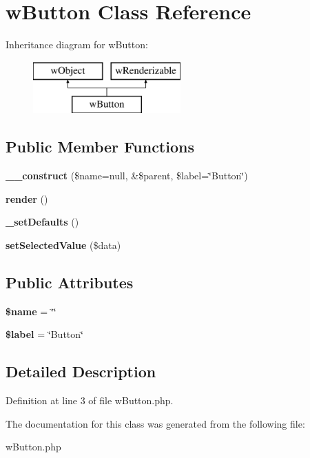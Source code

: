 \hypertarget{classwButton}{
\section{wButton Class Reference}
\label{classwButton}
}
Inheritance diagram for wButton:\begin{figure}[H]
\begin{center}
\leavevmode
\includegraphics[height=2.000000cm]{classwButton}
\end{center}
\end{figure}
\subsection*{Public Member Functions}
\begin{DoxyCompactItemize}
\item 
\hypertarget{classwButton_ae1900cf64a51d0ccc4e9fe46c0e8ad3c}{
{\bfseries \_\-\_\-construct} (\$name=null, \&\$parent, \$label=\char`\"{}Button\char`\"{})}
\label{classwButton_ae1900cf64a51d0ccc4e9fe46c0e8ad3c}

\item 
\hypertarget{classwButton_afa51efa71e726ced911b25826ba7f164}{
{\bfseries render} ()}
\label{classwButton_afa51efa71e726ced911b25826ba7f164}

\item 
\hypertarget{classwButton_a3badb068eb0f51744c3cb18389ad786d}{
{\bfseries \_\-setDefaults} ()}
\label{classwButton_a3badb068eb0f51744c3cb18389ad786d}

\item 
\hypertarget{classwButton_ac95d2874e371e3c6fc2d4d39cc9e8daf}{
{\bfseries setSelectedValue} (\$data)}
\label{classwButton_ac95d2874e371e3c6fc2d4d39cc9e8daf}

\end{DoxyCompactItemize}
\subsection*{Public Attributes}
\begin{DoxyCompactItemize}
\item 
\hypertarget{classwButton_a847efe4fc21eab72c010dc37c8a3b830}{
{\bfseries \$name} = \char`\"{}\char`\"{}}
\label{classwButton_a847efe4fc21eab72c010dc37c8a3b830}

\item 
\hypertarget{classwButton_a2f775d34d30c98f26d12ecf16c6dab84}{
{\bfseries \$label} = \char`\"{}Button\char`\"{}}
\label{classwButton_a2f775d34d30c98f26d12ecf16c6dab84}

\end{DoxyCompactItemize}


\subsection{Detailed Description}


Definition at line 3 of file wButton.php.



The documentation for this class was generated from the following file:\begin{DoxyCompactItemize}
\item 
wButton.php\end{DoxyCompactItemize}
